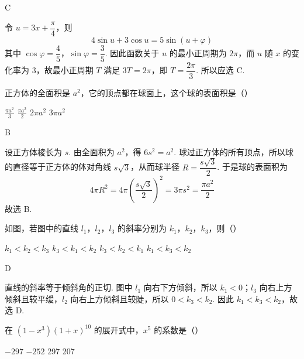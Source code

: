 \begin{answer}
C
\end{answer}

\begin{solution}
令 \(u=3x+\dfrac{\pi}{4}\)，则
\[
4\sin u+3\cos u=5\sin\left(u+\varphi\right)
\]
其中 \(\cos\varphi=\dfrac45\)，\(\sin\varphi=\dfrac35\). 因此函数关于 \(u\) 的最小正周期为 \(2\pi\)，而 \(u\) 随 \(x\) 的变化率为 \(3\)，故最小正周期 \(T\) 满足 \(3T=2\pi\)，即 \(T=\dfrac{2\pi}{3}\). 所以应选 C.
\end{solution}

\begin{problem}
正方体的全面积是 \(a^2\)，它的顶点都在球面上，这个球的表面积是（\quad）

\choices
    {\(\frac{\pi a^2}{3}\)}
    {\(\frac{\pi a^{2}}{2} \)}
    {\(2\pi a^{2}\)}
    {\(3\pi a^{2}\)}
\end{problem}

\begin{answer}
B
\end{answer}

\begin{solution}
设正方体棱长为 \(s\). 由全面积为 \(a^2\)，得 \(6s^2=a^2\). 球过正方体的所有顶点，所以球的直径等于正方体的体对角线 \(s\sqrt3\)，从而球半径 \(R=\dfrac{s\sqrt3}{2}\). 于是球的表面积为
\[
4\pi R^2=4\pi\left(\frac{s\sqrt3}{2}\right)^2=3\pi s^2=\frac{\pi a^2}{2}
\]
故选 B.
\end{solution}

\begin{problem}
如图，若图中的直线 \(l_{1}\)，\(l_{2}\)，\(l_{3}\) 的斜率分别为 \(k_{1}\)，\(k_{2}\)，\(k_{3}\)，则（\quad）


\choices
    {\(k_{1} < k_{2} < k_{3}\)}
    {\(k_{3} < k_{1} < k_{2}\)}
    {\(k_{3} < k_{2} < k_{1}\)}
    {\(k_{1} < k_{3} < k_{2}\)}
\end{problem}

\begin{answer}
D
\end{answer}

\begin{solution}
直线的斜率等于倾斜角的正切. 图中 \(l_1\) 向右下方倾斜，所以 \(k_1<0\)；\(l_3\) 向右上方倾斜且较平缓，\(l_2\) 向右上方倾斜且较陡，所以 \(0<k_3<k_2\). 因此 \(k_1<k_3<k_2\)，故选 D.
\end{solution}

\begin{problem}
在 \((1 - x^{3})(1 + x)^{10}\) 的展开式中，\(x^{5}\) 的系数是（\quad）

\choices
    {\(-297\)}
    {\(-252\)}
    {297}
    {207}
\end{problem}

